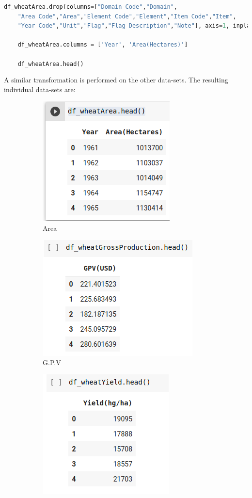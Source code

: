 \begin{lstlisting}[language=Python]
	df_wheatArea.drop(columns=["Domain Code","Domain",
	"Area Code","Area","Element Code","Element","Item Code","Item",
	"Year Code","Unit","Flag","Flag Description","Note"], axis=1, inplace=True)
	
	df_wheatArea.columns = ['Year', 'Area(Hectares)'] 
	
	df_wheatArea.head()
\end{lstlisting}

A similar transformation is performed on the other data-sets. The resulting individual data-sets are: 
\begin{figure}
	\centering
	\begin{subfigure}{.25\textwidth}
		\centering
		\includegraphics[width=.4\linewidth]{fig/areaHectares.png}
		\caption{Area}
		\label{fig:sub1}
	\end{subfigure}%
	\begin{subfigure}{.24\textwidth}
		\centering
		\includegraphics[width=.4\linewidth]{fig/gpv.png}
		\caption{G.P.V}
		\label{fig:sub2}
	\end{subfigure}
	\begin{subfigure}{.25\textwidth}
		\centering
		\includegraphics[width=.4\linewidth]{fig/yield.png}

\end{subfigure}
\end{figure}
